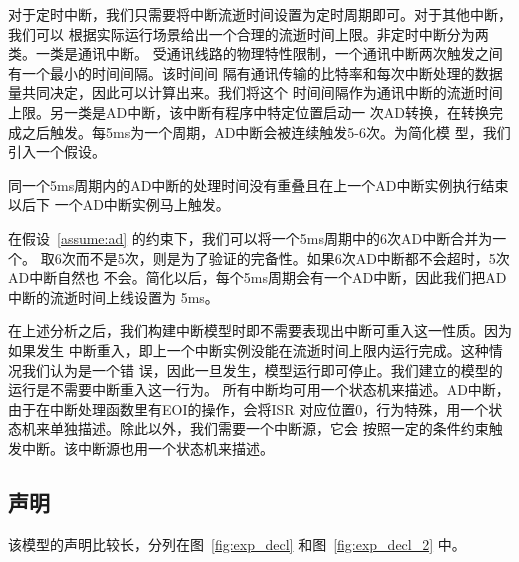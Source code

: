 对于定时中断，我们只需要将中断流逝时间设置为定时周期即可。对于其他中断，我们可以
根据实际运行场景给出一个合理的流逝时间上限。非定时中断分为两类。一类是通讯中断。
受通讯线路的物理特性限制，一个通讯中断两次触发之间有一个最小的时间间隔。该时间间
隔有通讯传输的比特率和每次中断处理的数据量共同决定，因此可以计算出来。我们将这个
时间间隔作为通讯中断的流逝时间上限。另一类是AD中断，该中断有程序中特定位置启动一
次AD转换，在转换完成之后触发。每5ms为一个周期，AD中断会被连续触发5-6次。为简化模
型，我们引入一个假设。

\begin{assumption}
	同一个5ms周期内的AD中断的处理时间没有重叠且在上一个AD中断实例执行结束以后下
	一个AD中断实例马上触发。
	\label{assume:ad}
\end{assumption}

在假设~\ref{assume:ad} 的约束下，我们可以将一个5ms周期中的6次AD中断合并为一个。
取6次而不是5次，则是为了验证的完备性。如果6次AD中断都不会超时，5次AD中断自然也
不会。简化以后，每个5ms周期会有一个AD中断，因此我们把AD中断的流逝时间上线设置为
5ms。

在上述分析之后，我们构建中断模型时即不需要表现出中断可重入这一性质。因为如果发生
中断重入，即上一个中断实例没能在流逝时间上限内运行完成。这种情况我们认为是一个错
误，因此一旦发生，模型运行即可停止。我们建立的模型的运行是不需要中断重入这一行为。
所有中断均可用一个状态机来描述。AD中断，由于在中断处理函数里有EOI的操作，会将ISR
对应位置0，行为特殊，用一个状态机来单独描述。除此以外，我们需要一个中断源，它会
按照一定的条件约束触发中断。该中断源也用一个状态机来描述。


\subsection{声明}
\label{subsec:exp_decl}

该模型的声明比较长，分列在图~\ref{fig:exp_decl} 和图~\ref{fig:exp_decl_2} 中。

